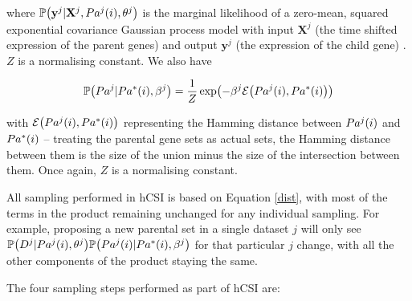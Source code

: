 \documentclass{article}
\let\originalleft\left
\let\originalright\right
\renewcommand{\left}{\mathopen{}\mathclose\bgroup\originalleft}
\renewcommand{\right}{\aftergroup\egroup\originalright}
\begin{document}
where $\mathbb{P}\left(\mathbf{y}^j|\mathbf{X}^j,Pa^j\left(i\right),\theta^j\right)$ is the marginal likelihood of a zero-mean, squared exponential covariance Gaussian process model with input $\mathbf{X}^j$ (the time shifted expression of the parent genes) and output $\mathbf{y}^j$ (the expression of the child gene) \citep{rasmussen2006}. $Z$ is a normalising constant. We also have

\begin{equation*}
\mathbb{P}\left(Pa^j|Pa^*\left(i\right),\beta^j\right) = \frac{1}{Z}\exp\left( -\beta^j\mathcal{E}\left(Pa^j\left(i\right),Pa^*\left(i\right)\right) \right)
\end{equation*}

with $\mathcal{E}\left(Pa^j\left(i\right),Pa^*\left(i\right)\right)$ representing the Hamming distance between $Pa^j\left(i\right)$ and $Pa^*\left(i\right)$ -- treating the parental gene sets as actual sets, the Hamming distance between them is the size of the union minus the size of the intersection between them. Once again, $Z$ is a normalising constant.

All sampling performed in hCSI is based on Equation \ref{dist}, with most of the terms in the product remaining unchanged for any individual sampling. For example, proposing a new parental set in a single dataset $j$ will only see $\mathbb{P}\left(D^j|Pa^j\left(i\right),\theta ^j\right)\mathbb{P}\left(Pa^j\left(i\right)|Pa^*\left(i\right),\beta ^j\right)$ for that particular $j$ change, with all the other components of the product staying the same.

The four sampling steps performed as part of hCSI are:
\end{document}

